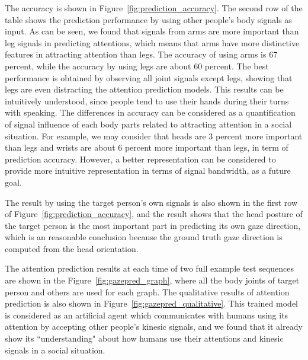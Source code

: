 The accuracy is shown in Figure~\ref{fig:prediction_accuracy}. The second row of the table shows the prediction performance by using other people's body signals as input. As can be seen, we found that signals from arms are more important than leg signals in predicting attentions, which means that arms have more distinctive features in attracting attention than legs. The accuracy of using arms is 67 percent, while the accuracy by using legs are about 60 percent. The best performance is obtained by observing all joint signals except legs, showing that legs are even distracting the attention prediction models. This results can be intuitively understood, since people tend to use their hands during their turns with speaking. The differences in accuracy can be considered as a quantification of signal influence of each body parts related to attracting attention in a social situation. For example, we may consider that heads are 3 percent more important than legs and wrists are about 6 percent more important than legs, in term of prediction accuracy. However, a better representation can be considered to provide more intuitive representation in terms of signal bandwidth, as a future goal.     

The result by using the target person's own signals is also shown in the first row of Figure~\ref{fig:prediction_accuracy}, and the result shows that the head posture of the target person is the most important part in predicting its own gaze direction, which is an reasonable conclusion because the ground truth gaze direction is computed from the head orientation. 

The attention prediction results at each time of two full example test sequences are shown in the  Figure~\ref{fig:gazepred_graph}, where all the body joints of target person and others are used for each graph. The qualitative results of attention prediction is also shown in  Figure~\ref{fig:gazepred_qualitative}.  This trained model is considered as an artificial agent which communicates with humans using its attention by accepting other people's kinesic signals, and we found that it already show its ``understanding" about how humans use their attentions and kinesic signals in a social situation.

